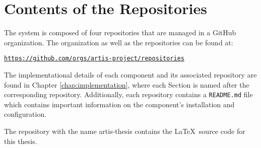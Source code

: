 \appendix

\chapter{Contents of the Repositories}
The system is composed of four repositories that are managed in a GitHub organization. The organization as well as the repositories can be found at:
\begin{center}
    \texttt{\href{https://github.com/orgs/artis-project/repositories}{https://github.com/orgs/artis-project/repositories}}
\end{center}

The implementational details of each component and its associated repository are found in Chapter \ref{chap:implementation}, where each Section is named after the corresponding repository. Additionally, each repository contains a \texttt{README.md} file which contains important information on the component's installation and configuration.

The repository with the name artis-thesis contains the \LaTeX \  source code for this thesis.
